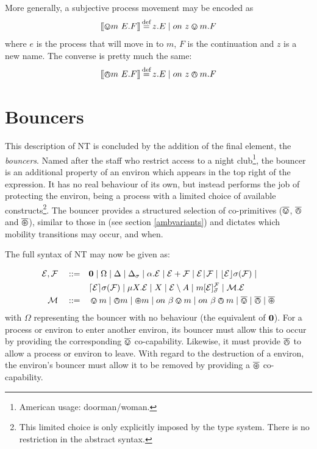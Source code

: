 More generally, a subjective process movement may be encoded as
\begin{equation}
[\hspace{-0.3ex}[ \varovee m\ {E}.F ]\hspace{-0.3ex}] \operatorname{\stackrel{\textrm{def}}{=}} z.E \;|\; on\ z \varovee m.F
\end{equation}
where $e$ is the process that will move in to $m$, $F$ is
the continuation and $z$ is a new name.  The converse is pretty much the same:
\begin{equation}
[\hspace{-0.3ex}[ \varowedge m\ {E}.F ]\hspace{-0.3ex}] \operatorname{\stackrel{\textrm{def}}{=}} z.E \;|\; on\ z \varowedge m.F
\end{equation}

\section{Bouncers}
\label{bouncers}

This description of NT is concluded by the addition of the final
element, the \emph{bouncers}.  Named after the staff who restrict
access to a night club\footnote{American usage: doorman/woman.}, the
bouncer is an additional property of an environ which appears in the
top right of the expression.  It has no real behaviour of its own, but
instead performs the job of protecting the environ, being a process
with a limited choice of available constructs\footnote{This limited
  choice is only explicitly imposed by the type system.  There is no
  restriction in the abstract syntax.}.  The bouncer provides a
structured selection of co-primitives ($\overline{\varovee}$, $\overline{\varowedge}$ and $\overline{\varoast}$),
similar to those in \cite{sangiorgi:mobsafeambients} (see section
\ref{ambvariants}) and dictates which mobility transitions may occur,
and when.

The full syntax of NT may now be given as:

\begin{equation}
  \begin{aligned}
    \text{$\mathcal{E}$}, \text{$\mathcal{F}$} \quad \mathrel{::=} \quad &
      \textbf{0}  \mid
      \Omega \mid
      \Delta \mid
      \Delta_{\sigma} \mid
      \alpha . \text{$\mathcal{E}$}  \mid
      \text{$\mathcal{E}$} + \text{$\mathcal{F}$} \mid
      \text{$\mathcal{E}$} \mathrel{\!|\!} \text{$\mathcal{F}$} \mid
      \lfloor{\text{$\mathcal{E}$}}\rfloor {\sigma} ({\text{$\mathcal{F}$}}) \mid \\
    & \lceil{\text{$\mathcal{E}$}}\rceil {\sigma} ({\text{$\mathcal{F}$}}) \mid 
      \mu X . \text{$\mathcal{E}$} \mid
      X \mid 
      \text{$\mathcal{E}$} \setminus {A} \mid
      {m}[ \text{$\mathcal{E}$} ]^{\text{$\mathcal{F}$}}_{\vec{\sigma}} \mid
      \text{$\mathcal{M}$} . \text{$\mathcal{E}$} \\
   \text{$\mathcal{M}$} \quad \mathrel{::=} \quad & \varovee m \mid \varowedge m \mid \varoast m \mid
      on\ \beta \varovee m \mid on\ \beta \varowedge m \mid \overline{\varovee} \mid
      \overline{\varowedge} \mid \overline{\varoast}
   \end{aligned}
   \label{eqn:nt:syntax}
\end{equation}
with $\Omega$ representing the bouncer with no behaviour (the
equivalent of $\textbf{0}$).  For a process or environ to enter another
environ, its bouncer must allow this to occur by providing the
corresponding $\overline{\varovee}$ co-capability.  Likewise, it must provide $\overline{\varowedge}$
to allow a process or environ to leave.  With regard to the destruction
of a environ, the environ's bouncer must allow it to be removed by
providing a $\overline{\varoast}$ co-capability.

